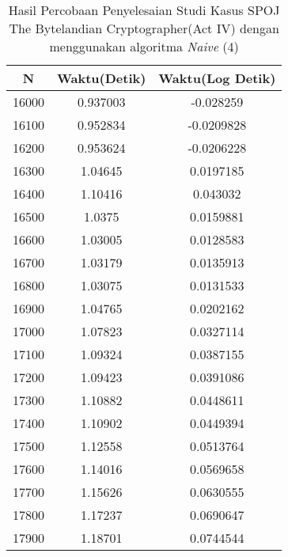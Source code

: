 \begin{table}[H]
\centering
\caption {Hasil Percobaan Penyelesaian Studi Kasus SPOJ The Bytelandian Cryptographer(Act IV) dengan menggunakan algoritma \textit{Naive} (4)}
\begin{tabular}{|c|c|c|}\hline
N&Waktu(Detik)&Waktu(Log Detik)\\ \hline
16000&0.937003&-0.028259\\ \hline
16100&0.952834&-0.0209828\\ \hline
16200&0.953624&-0.0206228\\ \hline
16300&1.04645&0.0197185\\ \hline
16400&1.10416&0.043032\\ \hline
16500&1.0375&0.0159881\\ \hline
16600&1.03005&0.0128583\\ \hline
16700&1.03179&0.0135913\\ \hline
16800&1.03075&0.0131533\\ \hline
16900&1.04765&0.0202162\\ \hline
17000&1.07823&0.0327114\\ \hline
17100&1.09324&0.0387155\\ \hline
17200&1.09423&0.0391086\\ \hline
17300&1.10882&0.0448611\\ \hline
17400&1.10902&0.0449394\\ \hline
17500&1.12558&0.0513764\\ \hline
17600&1.14016&0.0569658\\ \hline
17700&1.15626&0.0630555\\ \hline
17800&1.17237&0.0690647\\ \hline
17900&1.18701&0.0744544\\ \hline
\end{tabular}
\label{tab:res8}
\end{table}
